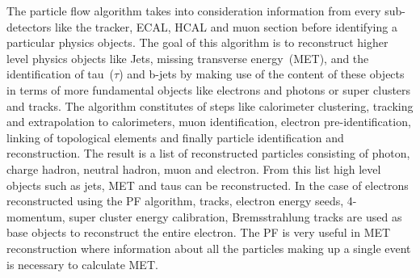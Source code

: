 The particle flow algorithm takes into consideration  information from every sub-detectors like the tracker, ECAL, HCAL and muon section before identifying a particular physics objects.
The goal of this algorithm is to reconstruct higher  level physics objects  like Jets, missing transverse energy~(MET),  and the identification of tau~($\tau$) and b-jets by making use of the content of these objects in terms of more fundamental objects like electrons and photons or super clusters and tracks.
The algorithm constitutes of steps like calorimeter clustering,  tracking and extrapolation to calorimeters, muon identification, electron pre-identification, linking of topological elements and finally particle identification and reconstruction. The result is a list of reconstructed particles consisting of photon, charge hadron, neutral hadron, muon and electron. From this list high level objects such as jets, MET and taus can be reconstructed.
In the case of electrons reconstructed using the PF algorithm, tracks, electron energy seeds, 4-momentum, super cluster energy calibration, Bremsstrahlung tracks are used as base objects to reconstruct the entire electron. The PF is very useful in MET reconstruction where information about all the particles making up a single event is necessary to calculate MET.


